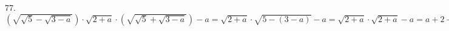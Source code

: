 77. $\left(\sqrt{\sqrt{5}-\sqrt{3-a}}\right)\cdot\sqrt{2+a}\cdot\left(\sqrt{\sqrt{5}+\sqrt{3-a}}\right)-a=
\sqrt{2+a}\cdot\sqrt{5-(3-a)}-a=\sqrt{2+a}\cdot\sqrt{2+a}-a=a+2-a=2.$\\
